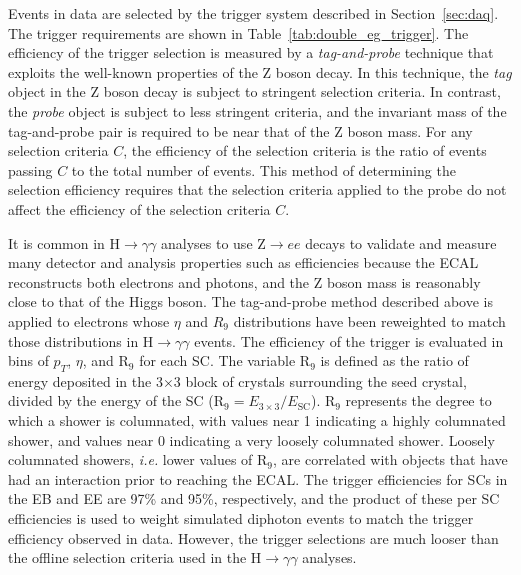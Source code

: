 Events in data are selected by the trigger system described in Section~\ref{sec:daq}. The trigger requirements are shown in Table~\ref{tab:double_eg_trigger}. The efficiency of the trigger selection is measured by a \textit{tag-and-probe} technique that exploits the well-known properties of the Z boson decay. In this technique, the \textit{tag} object in the Z boson decay is subject to stringent selection criteria. In contrast, the \textit{probe} object is subject to less stringent criteria, and the invariant mass of the tag-and-probe pair is required to be near that of the Z boson mass. For any selection criteria $C$, the efficiency of the selection criteria is the ratio of events passing $C$ to the total number of events. This method of determining the selection efficiency requires that the selection criteria applied to the probe do not affect the efficiency of the selection criteria $C$. 

It is common in H$\rightarrow\gamma\gamma$ analyses to use Z$\rightarrow ee$ decays to validate and measure many detector and analysis properties such as efficiencies because the ECAL reconstructs both electrons and photons, and the Z boson mass is reasonably close to that of the Higgs boson. The tag-and-probe method described above is applied to electrons whose $\eta$ and $R_9$ distributions have been reweighted to match those distributions in H$\rightarrow\gamma\gamma$ events. The efficiency of the trigger is evaluated in bins of $p_T$, $\eta$, and R$_9$ for each SC. The variable R$_9$ is defined as the ratio of energy deposited in the 3$\times$3 block of crystals surrounding the seed crystal, divided by the energy of the SC (R$_9 = E_{3\times3} / E_{\mathrm{SC}}$). R$_9$ represents the degree to which a shower is columnated, with values near 1 indicating a highly columnated shower, and values near 0 indicating a very loosely columnated shower. Loosely columnated showers, \textit{i.e.} lower values of R$_9$, are correlated with objects that have had an interaction prior to reaching the ECAL. The trigger efficiencies for SCs in the EB and EE are 97\% and 95\%, respectively, and the product of these per SC efficiencies is used to weight simulated diphoton events to match the trigger efficiency observed in data. However, the trigger selections are much looser than the offline selection criteria used in the H$\rightarrow\gamma\gamma$ analyses.


